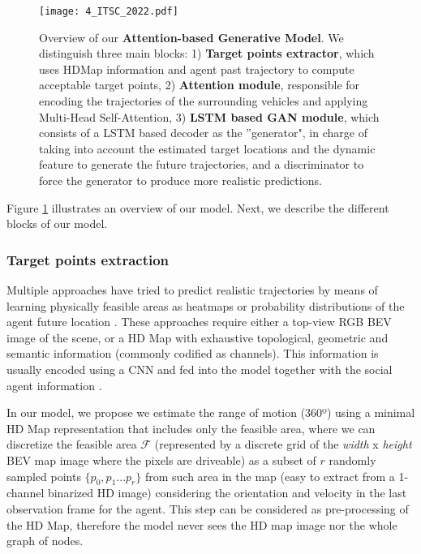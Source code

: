 \begin{figure}[h] 
	\centering
	\texttt{[image: 4\_ITSC\_2022.pdf]}
	\caption[Overview of our Attention-based Generative Model]{Overview of our \textbf{Attention-based Generative Model}. We distinguish three main blocks: 1) \textbf{Target points extractor}, which uses HDMap information and agent past trajectory to compute acceptable target points, 2) \textbf{Attention module}, responsible for encoding the trajectories of the surrounding vehicles and applying Multi-Head Self-Attention, 3) \textbf{LSTM based GAN module}, which consists of a LSTM based decoder as the ''generator", in charge of taking into account the estimated target locations and the dynamic feature to generate the future trajectories, and a discriminator to force the generator to produce more realistic predictions.}
	\label{fig:4_ITSC_2022}
\end{figure}

Figure \ref{fig:4_ITSC_2022} illustrates an overview of our model. Next, we describe the different blocks of our model.

\subsubsection{Target points extraction}
\label{subsubsec:4_gan_lstm_target_points_extraction}

Multiple approaches have tried to predict realistic trajectories by means of learning physically feasible areas as heatmaps or probability distributions of the agent future location \cite{dendorfer2020goal, sadeghian2019sophie, gilles2021home}. These approaches require either a top-view RGB BEV image of the scene, or a HD Map with exhaustive topological, geometric and semantic information (commonly codified as channels). This information is usually encoded using a CNN and fed into the model together with the social agent information \cite{dendorfer2020goal, sadeghian2019sophie, gao2020vectornet}.

In our model, we propose we estimate the range of motion (360º) using a minimal HD Map representation that includes only the feasible area, where we can discretize the feasible area $\mathcal{F}$ (represented by a discrete grid of the \textit{width} x \textit{height} BEV map image where the pixels are driveable) as a subset of $r$ randomly sampled points $\{p_0 , p_1 ... p_r\}$ from such area in the map (easy to extract from a 1-channel binarized HD image) considering the orientation and velocity in the last observation frame for the agent. This step can be considered as pre-processing of the HD Map, therefore the model never sees the HD map image nor the whole graph of nodes. 

